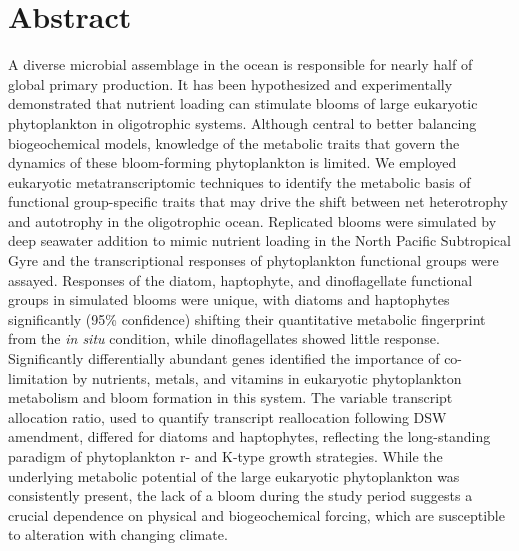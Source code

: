 \section{Abstract} 
A diverse microbial assemblage in the ocean is responsible for nearly half of global primary production. It has been hypothesized and experimentally demonstrated that nutrient loading can stimulate blooms of large eukaryotic phytoplankton in oligotrophic systems. Although central to better balancing biogeochemical models, knowledge of the metabolic traits that govern the dynamics of these bloom-forming phytoplankton is limited. We employed eukaryotic metatranscriptomic techniques to identify the metabolic basis of functional group-specific traits that may drive the shift between net heterotrophy and autotrophy in the oligotrophic ocean. Replicated blooms were simulated by deep seawater addition to mimic nutrient loading in the North Pacific Subtropical Gyre and the transcriptional responses of phytoplankton functional groups were assayed. Responses of the diatom, haptophyte, and dinoflagellate functional groups in simulated blooms were unique, with diatoms and haptophytes significantly (95\% confidence) shifting their quantitative metabolic fingerprint from the \textit{in situ} condition, while dinoflagellates showed little response. Significantly differentially abundant genes identified the importance of co-limitation by nutrients, metals, and vitamins in eukaryotic phytoplankton metabolism and bloom formation in this system. The variable transcript allocation ratio, used to quantify transcript reallocation following DSW amendment, differed for diatoms and haptophytes, reflecting the long-standing paradigm of phytoplankton r- and K-type growth strategies. While the underlying metabolic potential of the large eukaryotic phytoplankton was consistently present, the lack of a bloom during the study period suggests a crucial dependence on physical and biogeochemical forcing, which are susceptible to alteration with changing climate. 
 
